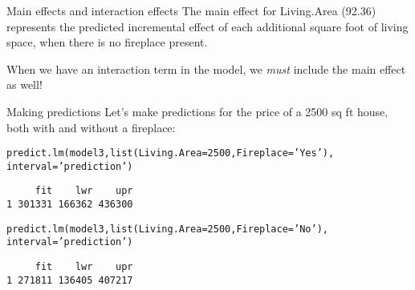\documentclass{beamer}\usepackage[]{graphicx}\usepackage[]{color}
\makeatletter
\newcommand{\hlnum}[1]{\textcolor[rgb]{0.824,0.412,0.118}{#1}}%
\newcommand{\hlstr}[1]{\textcolor[rgb]{1,0.894,0.71}{#1}}%
\newcommand{\hlstd}[1]{\textcolor[rgb]{1,0.894,0.769}{#1}}%
\newcommand{\hlkwc}[1]{\textcolor[rgb]{0.78,0.941,0.545}{#1}}%
\newcommand{\hlkwd}[1]{\textcolor[rgb]{1,0.78,0.769}{#1}}%
\newenvironment{kframe}{%
 \def\at@end@of@kframe{}%
 \ifinner\ifhmode%
  \def\at@end@of@kframe{\end{minipage}}%
  \begin{minipage}{\columnwidth}%
 \fi\fi%
 \def\FrameCommand##1{\hskip\@totalleftmargin \hskip-\fboxsep
 \colorbox{shadecolor}{##1}\hskip-\fboxsep
     \hskip-\linewidth \hskip-\@totalleftmargin \hskip\columnwidth}%
 \MakeFramed {\advance\hsize-\width
   \@totalleftmargin\z@ \linewidth\hsize
   \@setminipage}}%
 {\par\unskip\endMakeFramed%
 \at@end@of@kframe}
\newenvironment{knitrout}{}{} %
\makeatother
\begin{document}
\begin{darkframes}
\begin{frame}[fragile]{Main effects and interaction effects}
      \pause
      The main effect for Living.Area (92.36) represents the predicted incremental effect of each additional square foot of living space, when there is no fireplace present.

      \bigskip\pause
      When we have an interaction term in the model, we \emph{must} include the main effect as well!

      \lc
    \end{frame}

    \begin{frame}[fragile]{Making predictions}
      Let's make predictions for the price of a 2500 sq ft house, both with and without a fireplace:
\begin{knitrout}
\begin{kframe}
\begin{alltt}
\hlkwd{predict.lm}\hlstd{(model3,} \hlkwd{list}\hlstd{(}\hlkwc{Living.Area}\hlstd{=}\hlnum{2500}\hlstd{,} \hlkwc{Fireplace}\hlstd{=}\hlstr{'Yes'}\hlstd{),}
  \hlkwc{interval}\hlstd{=}\hlstr{'prediction'}\hlstd{)}
\end{alltt}
\begin{verbatim}
     fit    lwr    upr
1 301331 166362 436300
\end{verbatim}
\begin{alltt}
\hlkwd{predict.lm}\hlstd{(model3,} \hlkwd{list}\hlstd{(}\hlkwc{Living.Area}\hlstd{=}\hlnum{2500}\hlstd{,} \hlkwc{Fireplace}\hlstd{=}\hlstr{'No'}\hlstd{),}
  \hlkwc{interval}\hlstd{=}\hlstr{'prediction'}\hlstd{)}
\end{alltt}
\begin{verbatim}
     fit    lwr    upr
1 271811 136405 407217
\end{verbatim}
\end{kframe}
\end{knitrout}
    \end{frame}

  \end{darkframes}

  
\end{document}
